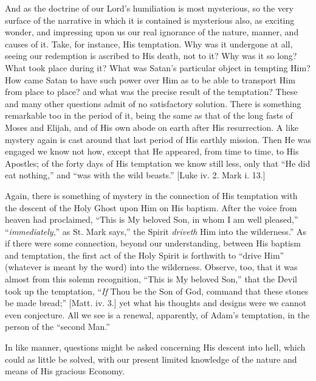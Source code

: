 And as the doctrine of our Lord's humiliation is most mysterious,
so the very surface of the narrative in which it is contained is
mysterious also, as exciting wonder, and impressing upon us our real
ignorance of the nature, manner, and causes of it. Take, for instance,
His temptation. Why was it undergone at all, seeing our redemption is
ascribed to His death, not to it? Why was it so long? What took place
during it? What was Satan's particular object in tempting Him? How
came Satan to have such power over Him as to be able to transport Him
from place to place? and what was the precise result of the
temptation? These and many other questions admit of no satisfactory
solution. There is something remarkable too in the period of it, being
the same as that of the long fasts of Moses and Elijah, and of His own
abode on earth after His resurrection. A like mystery again is cast
around that last period of His earthly mission. Then He was engaged we
know not how, except that He appeared, from time to time, to His
Apostles; of the forty days of His temptation we know still less, only
that ``He did eat nothing,'' and ``was with the wild
beasts.'' [Luke iv. 2. Mark i. 13.]

Again, there is something of mystery in the connection of His
temptation with the descent of the Holy Ghost upon Him on His baptism.
After the voice from heaven had proclaimed, ``This is My beloved
Son, in whom I am well pleased,'' ``\emph{immediately},''
as St. Mark says,'' the Spirit \emph{driveth} Him into the
wilderness.'' As if there were some connection, beyond our
understanding, between His baptism and temptation, the first act of
the Holy Spirit is forthwith to ``drive Him'' (whatever is
meant by the word) into the wilderness. Observe, too, that it was
almost from this solemn recognition, ``This is My beloved
Son,'' that the Devil took up the temptation, ``\emph{If} Thou
be the Son of God, command that these stones be made bread;''
[Matt. iv. 3.] yet what his thoughts and designs were we cannot even
conjecture. All we see is a renewal, apparently, of Adam's temptation,
in the person of the ``second Man.''

In like manner, questions might be asked concerning His descent
into hell, which could as little be solved, with our present limited
knowledge of the nature and means of His gracious Economy.

